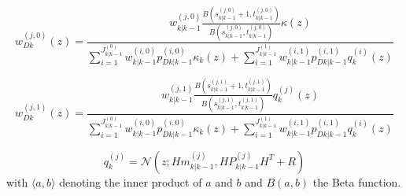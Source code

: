 \documentclass{article}
\newcommand{\clut}{{(0)}}
\newcommand{\tgt}{{(1)}}
\newcommand{\clutj}{{(j,0)}}
\newcommand{\tgtj}{{(j,1)}}
\newcommand{\cluti}{{(i,0)}}
\newcommand{\tgti}{{(i,1)}}
\begin{document}
\begin{equation}
  \label{eq:lpdwD0}
  w_{Dk}^\clutj(z) = \frac{w_{k|k-1}^\clutj  \frac{B\left( s_{k|k-1}^\clutj+1,t_{k|k-1}^\clutj\right)}{B\left( s_{k|k-1}^\clutj,t_{k|k-1}^\clutj\right)}\kappa(z)}
  {\sum_{i=1}^{J_{k|k-1}^\clut}w_{k|k-1}^\cluti p_{Dk|k-1}^\cluti\kappa_k(z) +  \sum_{i=1}^{J_{k|k-1}^\tgt}w_{k|k-1}^\tgti p_{Dk|k-1}^\tgti q_k^{(i)}(z)  }
\end{equation}

\begin{equation}
  \label{eq:lpdwD1}
  w_{Dk}^\tgtj(z) = \frac{w_{k|k-1}^\tgtj  \frac{B\left( s_{k|k-1}^\tgtj+1,t_{k|k-1}^\tgtj\right)}{B\left( s_{k|k-1}^\tgtj,t_{k|k-1}^\tgtj\right)}q_k^{(j)}(z)}
  {\sum_{i=1}^{J_{k|k-1}^\clut}w_{k|k-1}^\cluti p_{Dk|k-1}^\cluti\kappa_k(z) +  \sum_{i=1}^{J_{k|k-1}^\tgt}w_{k|k-1}^\tgti p_{Dk|k-1}^\tgti q_k^{(i)}(z)  }
\end{equation}


\begin{equation}
  \label{eq:qz}
  q_k^{(j)} = \mathcal{N}(z;Hm_{k|k-1}^{(j)}, HP_{k|k-1}^{(j)}H^T + R)
\end{equation}
with $\langle a, b \rangle$ denoting the inner product of $a$ and $b$ and $B(a, b)$ the Beta function.
\end{document}
